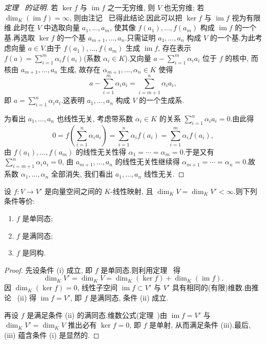 \begin{proof}[定理~ 的证明]
若 $\ker f$ 与 $\operatorname{im} f$ 之一无穷维, 则 $V$ 也无穷维; 若 $\dim_K(\operatorname{im} f) = \infty$, 则由注记~ 已得此结论.因此可以把 $\ker f$ 与 $\operatorname{im} f$ 视为有限维.此时在 $V$ 中选取向量 $a_1, \ldots, a_m$, 使其像 $f(a_1), \ldots, f(a_m)$ 构成 $\operatorname{im} f$ 的一个基.再选取 $\ker f$ 的一个基 $a_{m+1}, \ldots, a_n$.只需证明 $a_1, \ldots, a_n$ 构成 $V$ 的一个基.为此考虑向量 $a \in V$.由于 $f(a_1), \ldots, f(a_m)$ 生成 $\operatorname{im} f$, 存在表示 $f(a) = \sum_{i = 1}^{m} \alpha_i f(a_i)$(系数 $\alpha_i \in K$).又向量 $a - \sum_{i = 1}^{m} \alpha_i a_i$ 位于 $f$ 的核中, 而核由 $a_{m+1}, \ldots, a_n$ 生成, 故存在 $\alpha_{m+1}, \ldots, \alpha_n \in K$ 使得
\[
a - \sum_{i = 1}^{m} \alpha_i a_i = \sum_{i = m+1}^{n} \alpha_i a_i,
\]
即 $a = \sum_{i = 1}^{n} \alpha_i a_i$.这表明 $a_1, \ldots, a_n$ 构成 $V$ 的一个生成系.

为看出 $a_1, \ldots, a_n$ 也线性无关, 考虑带系数 $\alpha_i \in K$ 的关系 $\sum_{i = 1}^{n} \alpha_i a_i = 0$.由此得
\[
0 = f\left(\sum_{i = 1}^{n} \alpha_i a_i\right) = \sum_{i = 1}^{n} \alpha_i f(a_i) = \sum_{i = 1}^{m} \alpha_i f(a_i),
\]
由 $f(a_1), \ldots, f(a_m)$ 的线性无关性得 $\alpha_1 = \cdots = \alpha_m = 0$.于是又有 $\sum_{i = m+1}^{n} \alpha_i a_i = 0$, 由 $a_{m+1}, \ldots, a_n$ 的线性无关性继续得 $\alpha_{m+1} = \cdots = \alpha_n = 0$.故系数 $\alpha_1, \ldots, \alpha_n$ 全部消失, 我们看出 $a_1, \ldots, a_n$ 线性无关.
\end{proof}

\begin{corollary}\label{cor:2.1.11}
设 $f \colon V \longrightarrow V'$ 是向量空间之间的 $K$-线性映射, 且 $\dim_K V = \dim_K V' < \infty$.则下列条件等价:
\begin{enumerate}
\item[(i)] $f$ 是单同态;
\item[(ii)] $f$ 是满同态;
\item[(iii)] $f$ 是同构.
\end{enumerate}
\end{corollary}

\begin{proof}
先设条件 (i) 成立, 即 $f$ 是单同态.则利用定理~ 得
\[
\dim_K V' = \dim_K V = \dim_K(\ker f) + \dim_K(\operatorname{im} f)\text{.}
\]
因 $\dim_K(\ker f) = 0$, 线性子空间 $\operatorname{im} f \subset V'$ 与 $V'$ 具有相同的(有限)维数.由推论~ (ii) 得 $\operatorname{im} f = V'$, 即 $f$ 是满同态, 条件 (ii) 成立.

再设 $f$ 是满足条件 (ii) 的满同态.维数公式(定理~)由 $\operatorname{im} f = V'$ 与 $\dim_K V' = \dim_K V$ 推出必有 $\ker f = 0$, 即 $f$ 是单射, 从而满足条件 (iii).最后, (iii) 蕴含条件 (i) 是显然的.
\end{proof}

